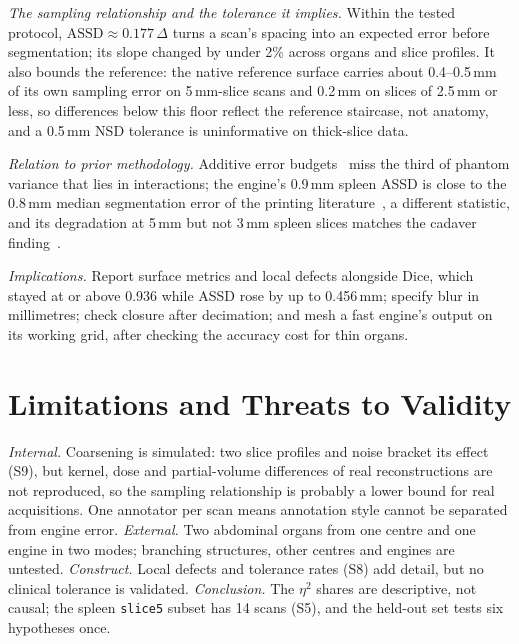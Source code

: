 \documentclass[conference]{IEEEtran}
\newcommand{\lvl}[1]{\texttt{#1}}
\newcommand{\mm}{\,mm\xspace}
\begin{document}
\emph{The sampling relationship and the tolerance it implies.} Within the tested protocol, $\text{ASSD}\approx0.177\,\Delta$ turns a scan's spacing into an expected error before segmentation; its slope changed by under 2\% across organs and slice profiles. It also bounds the reference: the native reference surface carries about 0.4--0.5\mm of its own sampling error on 5\mm-slice scans and 0.2\mm on slices of 2.5\mm or less, so differences below this floor reflect the reference staircase, not anatomy, and a 0.5\mm NSD tolerance is uninformative on thick-slice data.

\emph{Relation to prior methodology.} Additive error budgets~\cite{juergensen2024phantom} miss the third of phantom variance that lies in interactions; the engine's 0.9\mm spleen ASSD is close to the 0.8\mm median segmentation error of the printing literature~\cite{schulze2024qa}, a different statistic, and its degradation at 5\mm but not 3\mm spleen slices matches the cadaver finding~\cite{ahmed2024mandible}.

\emph{Implications.} Report surface metrics and local defects alongside Dice, which stayed at or above 0.936 while ASSD rose by up to 0.456\mm; specify blur in millimetres; check closure after decimation; and mesh a fast engine's output on its working grid, after checking the accuracy cost for thin organs.

\section{Limitations and Threats to Validity}
\emph{Internal.} Coarsening is simulated: two slice profiles and noise bracket its effect (S9), but kernel, dose and partial-volume differences of real reconstructions are not reproduced, so the sampling relationship is probably a lower bound for real acquisitions. One annotator per scan means annotation style cannot be separated from engine error.
\emph{External.} Two abdominal organs from one centre and one engine in two modes; branching structures, other centres and engines are untested.
\emph{Construct.} Local defects and tolerance rates (S8) add detail, but no clinical tolerance is validated.
\emph{Conclusion.} The $\eta^2$ shares are descriptive, not causal; the spleen \lvl{slice5} subset has 14 scans (S5), and the held-out set tests six hypotheses once.

\end{document}

